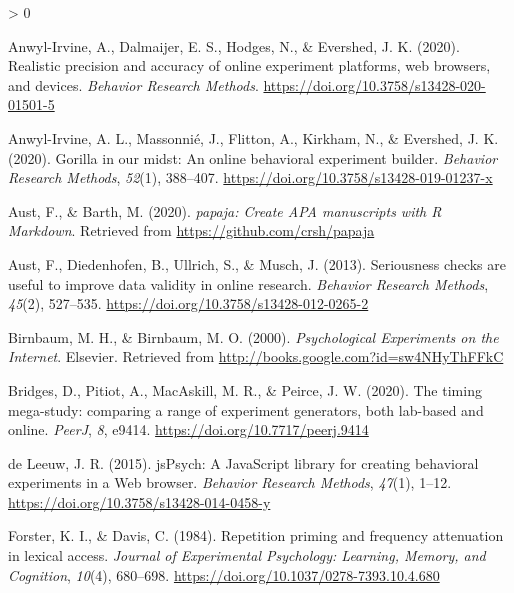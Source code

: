\documentclass[
  english,
  man]{apa6}
\newlength{\cslhangindent}
\newenvironment{CSLReferences}[2] %
 {%
  \setlength{\parindent}{0pt}
  \ifodd #1 \everypar{\setlength{\hangindent}{\cslhangindent}}\ignorespaces\fi
  \ifnum #2 > 0
  \setlength{\parskip}{#2\baselineskip}
  \fi
 }%
 {}
\begin{document}
\hypertarget{refs}{}
\begin{CSLReferences}{1}{0}
\leavevmode\hypertarget{ref-anwyl-irvine2020a}{}%
Anwyl-Irvine, A., Dalmaijer, E. S., Hodges, N., \& Evershed, J. K. (2020). Realistic precision and accuracy of online experiment platforms, web browsers, and devices. \emph{Behavior Research Methods}. \url{https://doi.org/10.3758/s13428-020-01501-5}

\leavevmode\hypertarget{ref-anwyl-irvine2020}{}%
Anwyl-Irvine, A. L., Massonnié, J., Flitton, A., Kirkham, N., \& Evershed, J. K. (2020). Gorilla in our midst: An online behavioral experiment builder. \emph{Behavior Research Methods}, \emph{52}(1), 388--407. \url{https://doi.org/10.3758/s13428-019-01237-x}

\leavevmode\hypertarget{ref-R-papaja}{}%
Aust, F., \& Barth, M. (2020). \emph{{papaja}: {Create} {APA} manuscripts with {R Markdown}}. Retrieved from \url{https://github.com/crsh/papaja}

\leavevmode\hypertarget{ref-austSeriousnessChecksAre2013}{}%
Aust, F., Diedenhofen, B., Ullrich, S., \& Musch, J. (2013). Seriousness checks are useful to improve data validity in online research. \emph{Behavior Research Methods}, \emph{45}(2), 527--535. \url{https://doi.org/10.3758/s13428-012-0265-2}

\leavevmode\hypertarget{ref-birnbaumPsychologicalExperimentsInternet2000a}{}%
Birnbaum, M. H., \& Birnbaum, M. O. (2000). \emph{Psychological {Experiments} on the {Internet}}. {Elsevier}. Retrieved from \url{http://books.google.com?id=sw4NHyThFFkC}

\leavevmode\hypertarget{ref-bridges2020}{}%
Bridges, D., Pitiot, A., MacAskill, M. R., \& Peirce, J. W. (2020). The timing mega-study: comparing a range of experiment generators, both lab-based and online. \emph{PeerJ}, \emph{8}, e9414. \url{https://doi.org/10.7717/peerj.9414}

\leavevmode\hypertarget{ref-deleeuw2015}{}%
de Leeuw, J. R. (2015). jsPsych: A JavaScript library for creating behavioral experiments in a Web browser. \emph{Behavior Research Methods}, \emph{47}(1), 1--12. \url{https://doi.org/10.3758/s13428-014-0458-y}

\leavevmode\hypertarget{ref-forsterRepetitionPrimingFrequency1984}{}%
Forster, K. I., \& Davis, C. (1984). Repetition priming and frequency attenuation in lexical access. \emph{Journal of Experimental Psychology: Learning, Memory, and Cognition}, \emph{10}(4), 680--698. \url{https://doi.org/10.1037/0278-7393.10.4.680}


\end{CSLReferences}
\end{document}
